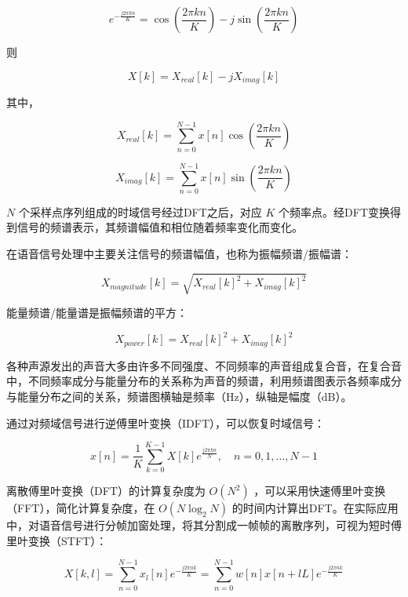 \documentclass[cn,10pt,math=newtx,citestyle=gb7714-2015,bibstyle=gb7714-2015]{elegantbook}
\begin{document}
\begin{equation}
  e^{-\frac{j2\pi kn}{K}}=\mathop{cos}(\frac{2\pi kn}{K})-j\mathop{sin}(\frac{2\pi kn}{K})
\end{equation}

则

\begin{equation}
  X[k]=X_{real}[k]-jX_{imag}[k]
\end{equation}

其中，

\begin{equation}
  X_{real}[k]=\sum_{n=0}^{N-1}x[n]\mathop{cos}(\frac{2\pi kn}{K})
\end{equation}

\begin{equation}
  X_{imag}[k]=\sum_{n=0}^{N-1}x[n]\mathop{sin}(\frac{2\pi kn}{K})
\end{equation}

$N$ 个采样点序列组成的时域信号经过DFT之后，对应 $K$ 个频率点。经DFT变换得到信号的频谱表示，其频谱幅值和相位随着频率变化而变化。

在语音信号处理中主要关注信号的频谱幅值，也称为振幅频谱/振幅谱：

\begin{equation}
  X_{magnitude}[k]=\sqrt{X_{real}[k]^2+X_{imag}[k]^2}
\end{equation}

能量频谱/能量谱是振幅频谱的平方：

\begin{equation}
  X_{power}[k]=X_{real}[k]^2+X_{imag}[k]^2
\end{equation}

各种声源发出的声音大多由许多不同强度、不同频率的声音组成复合音，在复合音中，不同频率成分与能量分布的关系称为声音的频谱，利用频谱图表示各频率成分与能量分布之间的关系，频谱图横轴是频率（Hz），纵轴是幅度（dB）。

通过对频域信号进行逆傅里叶变换（IDFT），可以恢复时域信号：

\begin{equation}
  x[n]=\frac{1}{K}\sum_{k=0}^{K-1}X[k]e^{\frac{j2\pi kn}{N}},\quad n=0,1,...,N-1
\end{equation}

离散傅里叶变换（DFT）的计算复杂度为 $O(N^2)$ ，可以采用快速傅里叶变换（FFT），简化计算复杂度，在 $O(N\mathop{log}_2 N)$ 的时间内计算出DFT。在实际应用中，对语音信号进行分帧加窗处理，将其分割成一帧帧的离散序列，可视为短时傅里叶变换（STFT）：

\begin{equation}
  X[k,l]=\sum_{n=0}^{N-1} x_l[n]e^{-\frac{j2\pi nk}{K}}=\sum_{n=0}^{N-1} w[n]x[n+lL]e^{-\frac{j2\pi nk}{K}}
\end{equation}
\end{document}
